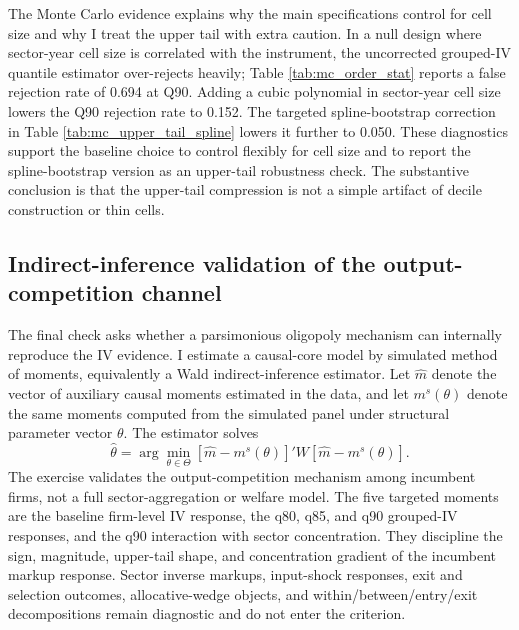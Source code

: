 ﻿\documentclass[12pt]{article}
\begin{document}
The Monte Carlo evidence explains why the main specifications control for cell size and why I treat the upper tail with extra caution. In a null design where sector-year cell size is correlated with the instrument, the uncorrected grouped-IV quantile estimator over-rejects heavily; Table \ref{tab:mc_order_stat} reports a false rejection rate of 0.694 at Q90. Adding a cubic polynomial in sector-year cell size lowers the Q90 rejection rate to 0.152. The targeted spline-bootstrap correction in Table \ref{tab:mc_upper_tail_spline} lowers it further to 0.050. These diagnostics support the baseline choice to control flexibly for cell size and to report the spline-bootstrap version as an upper-tail robustness check. The substantive conclusion is that the upper-tail compression is not a simple artifact of decile construction or thin cells.

\subsection{Indirect-inference validation of the output-competition channel}
\label{sec:smm_validation}

The final check asks whether a parsimonious oligopoly mechanism can internally reproduce the IV evidence. I estimate a causal-core model by simulated method of moments, equivalently a Wald indirect-inference estimator. Let \(\widehat m\) denote the vector of auxiliary causal moments estimated in the data, and let \(m^{s}(\theta)\) denote the same moments computed from the simulated panel under structural parameter vector \(\theta\). The estimator solves
\begin{equation}
\widehat\theta
=\arg\min_{\theta\in\Theta}
\left[\widehat m-m^{s}(\theta)\right]'
W
\left[\widehat m-m^{s}(\theta)\right].
\end{equation}
The exercise validates the output-competition mechanism among incumbent firms, not a full sector-aggregation or welfare model. The five targeted moments are the baseline firm-level IV response, the q80, q85, and q90 grouped-IV responses, and the q90 interaction with sector concentration. They discipline the sign, magnitude, upper-tail shape, and concentration gradient of the incumbent markup response. Sector inverse markups, input-shock responses, exit and selection outcomes, allocative-wedge objects, and within/between/entry/exit decompositions remain diagnostic and do not enter the criterion.
\end{document}
